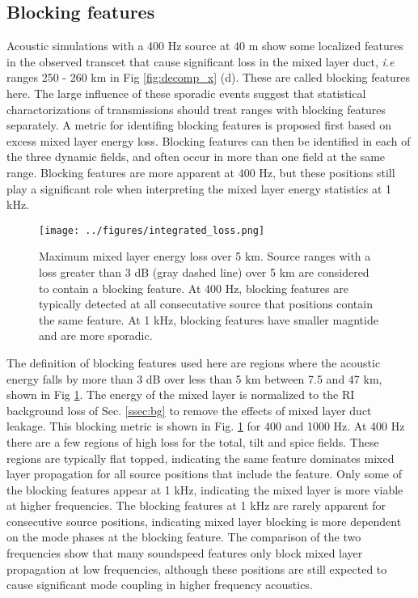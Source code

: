 \documentclass[preprint,NumberedRefs]{JASA}
\begin{document}
\subsection{Blocking features}
Acoustic simulations with a 400 Hz source at 40 m show some localized features in the observed transcet that cause significant loss in the mixed layer duct, \emph{i.e} ranges 250 - 260 km in Fig \ref{fig:decomp_x} (d). These are called blocking features here. The large influence of these sporadic events suggest that statistical charactorizations of transmissions should treat ranges with blocking features separately. A metric for identifing blocking features is proposed first based on excess mixed layer energy loss. Blocking features can then be identified in each of the three dynamic fields, and often occur in more than one field at the same range. Blocking features are more apparent at 400 Hz, but these positions still play a significant role when interpreting the mixed layer energy statistics at 1 kHz.

\begin{figure}
\texttt{[image: ../figures/integrated\_loss.png]}
    \caption{Maximum mixed layer energy loss over 5 km. Source ranges with a loss greater than 3 dB (gray dashed line) over 5 km are considered to contain a blocking feature. At 400 Hz, blocking features are typically detected at all consecutative source that positions contain the same feature. At 1 kHz, blocking features have smaller magntide and are more sporadic.}
    \label{fig:blocking}
\end{figure}

The definition of blocking features used here are regions where the acoustic energy falls by more than 3 dB over less than 5 km between 7.5 and 47 km, shown in Fig \ref{fig:blocking}. The energy of the mixed layer is normalized to the RI background loss of Sec. \ref{ssec:bg} to remove the effects of mixed layer duct leakage. This blocking metric is shown in Fig. \ref{fig:blocking} for 400 and 1000 Hz. At 400 Hz there are a few regions of high loss for the total, tilt and spice fields. These regions are typically flat topped, indicating the same feature dominates mixed layer propagation for all source positions that include the feature. Only some of the blocking features appear at 1 kHz, indicating the mixed layer is more viable at higher frequencies. The blocking features at 1 kHz are rarely apparent for consecutive source positions, indicating mixed layer blocking is more dependent on the mode phases at the blocking feature. The comparison of the two frequencies show that many soundspeed features only block mixed layer propagation at low frequencies, although these positions are still expected to cause significant mode coupling in higher frequency acoustics.
\end{document}
